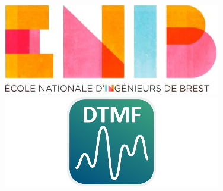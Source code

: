 \documentclass[a4paper, twoside]{article} %
\begin{document}
\begin{figure}[t]
	\begin{minipage}[b]{0.2\linewidth}
		\raggedright \includegraphics[scale=0.5]{enib.jpg}
	\end{minipage}\hfill
	\begin{minipage}[b]{0.4\linewidth}	
		\raggedleft \includegraphics[scale=0.5]{logo.jpg}
	\end{minipage}
\end{figure}
\end{document}
